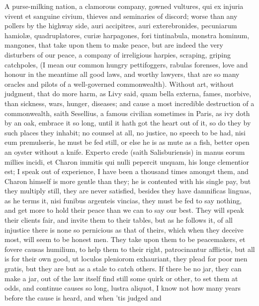 {A purse-milking nation, a clamorous company, gowned vultures, qui
ex injuria vivent et sanguine civium, thieves and seminaries of
discord; worse than any pollers by the highway side, auri accipitres,
auri exterebronides, pecuniarum hamiol\ae{}, quadruplatores, curi\ae{}
harpagones, fori tintinabula, monstra hominum, mangones, \etc{} that take
upon them to make peace, but are indeed the very disturbers of our
peace, a company of irreligious harpies, scraping, griping catchpoles,
(I mean our common hungry pettifoggers, rabulas forenses, love and
honour in the meantime all good laws, and worthy lawyers, that are so
many oracles and pilots of a well-governed commonwealth). Without
art, without judgment, that do more harm, as Livy said, quam bella
externa, fames, morbive, than sickness, wars, hunger, diseases; and
cause a most incredible destruction of a commonwealth, saith
Sesellius, a famous civilian sometimes in Paris, as ivy doth by an
oak, embrace it so long, until it hath got the heart out of it, so do
they by such places they inhabit; no counsel at all, no justice, no
speech to be had, nisi eum premulseris, he must be fed still, or else
he is as mute as a fish, better open an oyster without a knife. Experto
crede (saith  Salisburiensis) in manus eorum millies incidi, et
Charon immitis qui nulli pepercit unquam, his longe clementior est; I
speak out of experience, I have been a thousand times amongst them, and
Charon himself is more gentle than they; he is contented with his
single pay, but they multiply still, they are never satisfied, besides
they have damnificas linguas, as he terms it, nisi funibus argenteis
vincias, they must be fed to say nothing, and get more to hold
their peace than we can to say our best. They will speak their clients
fair, and invite them to their tables, but as he follows it, of
all injustice there is none so pernicious as that of theirs, which when
they deceive most, will seem to be honest men. They take upon them to
be peacemakers, et fovere causas humilium, to help them to their right,
patrocinantur afflictis, but all is for their own good, ut loculos
pleniorom exhauriant, they plead for poor men gratis, but they are but
as a stale to catch others. If there be no jar, they can make a
jar, out of the law itself find still some quirk or other, to set them
at odds, and continue causes so long, lustra aliquot, I know not how
many years before the cause is heard, and when 'tis judged and
}
